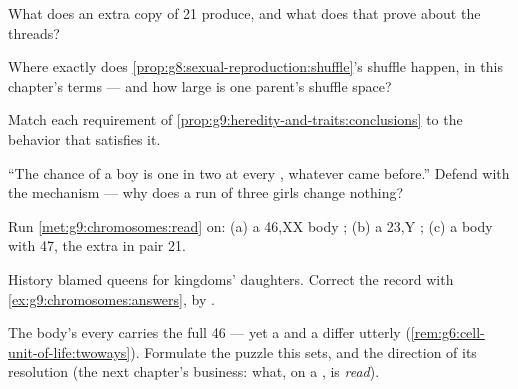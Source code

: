 \begin{exercise}[$\star$]\label{exo:g9:chromosomes:6}
What does an extra copy of  21 produce, and
what does that prove about the threads?
\end{exercise}

\begin{exercise}[$\star\star$]\label{exo:g9:chromosomes:7}
Where exactly does
\cref{prop:g8:sexual-reproduction:shuffle}'s shuffle
happen, in this chapter's terms --- and how large is one
parent's shuffle space?
\end{exercise}

\begin{exercise}[$\star\star$]\label{exo:g9:chromosomes:8}
Match each requirement of
\cref{prop:g9:heredity-and-traits:conclusions} to the
 behavior that satisfies it.
\end{exercise}

\begin{exercise}[$\star\star$]\label{exo:g9:chromosomes:9}
``The chance of a boy is one in two at every ,
whatever came before.'' Defend with the mechanism ---
why does a run of three girls change nothing?
\end{exercise}

\begin{exercise}[$\star\star$]\label{exo:g9:chromosomes:10}
Run \cref{met:g9:chromosomes:read} on: (a) a 46,XX body
; (b) a 23,Y ; (c) a body  with 47, the
extra in pair 21.
\end{exercise}

\begin{exercise}[$\star\star$]\label{exo:g9:chromosomes:11}
History blamed queens for kingdoms' daughters. Correct
the record with \cref{ex:g9:chromosomes:answers}, 
by .
\end{exercise}

\begin{exercise}[$\star\star\star$]\label{exo:g9:chromosomes:12}
The body's every  carries the full 46 --- yet a
 and a   differ utterly
(\cref{rem:g6:cell-unit-of-life:twoways}). Formulate the
puzzle this sets, and the direction of its resolution
(the next chapter's business: what, on a , is
\emph{read}).
\end{exercise}

